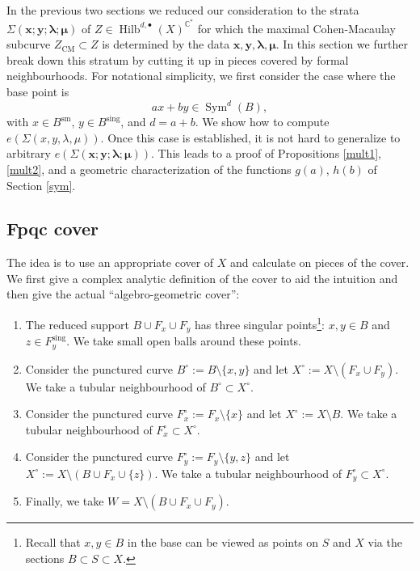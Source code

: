 \documentclass{amsart}
\theoremstyle{definition}
\newcommand{\CC} {\mathbb{C}}          %
\newcommand{\Sym}{\operatorname{Sym}}
\newcommand{\Hilb}{\operatorname{Hilb}}
\newcommand{\CM}{\operatorname{CM}}
\newcommand{\sm}{\operatorname{sm}}
\newcommand{\sing}{\operatorname{sing}}
\begin{document}
In the previous two sections we reduced our consideration to the strata $\Sigma(\boldsymbol{x};\boldsymbol{y};\boldsymbol{\lambda};\boldsymbol{\mu})$ of $Z \in \Hilb^{d,\bullet}(X)^{\CC^*}$ for which the maximal Cohen-Macaulay subcurve $Z_{\CM} \subset Z$ is determined by the data $\boldsymbol{x}, \boldsymbol{y}, \boldsymbol{\lambda}, \boldsymbol{\mu}$. In this section we further break down this stratum by cutting it up in pieces covered by formal neighbourhoods. For notational simplicity, we first consider the case where the base point is 
$$
a x + b y \in \Sym^d(B),
$$
with $x \in B^{\sm}$, $y \in B^{\sing}$, and $d=a+b$. We show how to compute $e(\Sigma(x,y,\lambda,\mu))$. Once this case is established, it is not hard to generalize to arbitrary $e(\Sigma(\boldsymbol{x};\boldsymbol{y};\boldsymbol{\lambda};\boldsymbol{\mu}))$. This leads to a proof of Propositions \ref{mult1}, \ref{mult2}, and a geometric characterization of the functions $g(a)$, $h(b)$ of Section \ref{sym}.


\subsection{Fpqc cover}

The idea is to use an appropriate cover of $X$ and calculate on pieces of the cover. We first give a complex analytic definition of the cover to aid the intuition and then give the actual ``algebro-geometric cover'': 
\begin{enumerate}
\item The reduced support $B \cup F_x \cup F_y$ has three singular points\footnote{Recall that $x,y \in B$ in the base can be viewed as points on $S$ and $X$ via the sections $B \subset S \subset X$.}: $x,y \in B$ and $z \in F^{\sing}_{y}$. We take small open balls around these points.
\item Consider the punctured curve $B^\circ := B \setminus \{x,y\}$ and let $X^\circ := X \setminus (F_x  \cup F_y)$. We take a tubular neighbourhood of $B^\circ \subset X^\circ$.
\item Consider the punctured curve $F_{x}^{\circ} := F_x \setminus \{x\}$ and let $X^\circ := X \setminus B$. We take a tubular neighbourhood of $F_{x}^\circ \subset X^\circ$.
\item Consider the punctured curve $F_{y}^{\circ} := F_y \setminus \{y,z\}$ and let $X^\circ := X \setminus (B \cup F_x \cup \{z\})$. We take a tubular neighbourhood of $F_{y}^{\circ} \subset X^\circ$.
\item Finally, we take $W = X \setminus (B \cup F_x \cup F_y)$. 
\end{enumerate}
\end{document}
